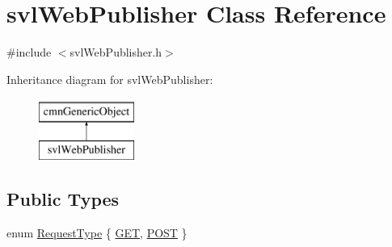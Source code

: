 \hypertarget{classsvl_web_publisher}{\section{svl\-Web\-Publisher Class Reference}
\label{classsvl_web_publisher}
}


{\ttfamily \#include $<$svl\-Web\-Publisher.\-h$>$}

Inheritance diagram for svl\-Web\-Publisher\-:\begin{figure}[H]
\begin{center}
\leavevmode
\includegraphics[height=2.000000cm]{d5/df7/classsvl_web_publisher}
\end{center}
\end{figure}
\subsection*{Public Types}
\begin{DoxyCompactItemize}
\item 
enum \hyperlink{classsvl_web_publisher_a88f1268e9e8fc3b535e90fc8132643fd}{Request\-Type} \{ \hyperlink{classsvl_web_publisher_a88f1268e9e8fc3b535e90fc8132643fda7af1429896d3bb9288257d80d75622ad}{G\-E\-T}, 
\hyperlink{classsvl_web_publisher_a88f1268e9e8fc3b535e90fc8132643fda805c133e89e47b0be407fd34d3f9188b}{P\-O\-S\-T}
 \}
\end{DoxyCompactItemize}
